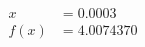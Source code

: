 \documentclass[preview]{standalone}
\begin{document}
\begin{align*}
x &= 0.0003\\f(x) &= 4.0074370
\end{align*}
\end{document}

